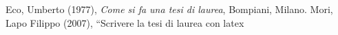 \begin{thebibliography}{9}
Eco, Umberto (1977),
\emph{Come si fa una tesi di
laurea}, Bompiani, Milano.
Mori, Lapo Filippo (2007),
“Scrivere la tesi di laurea
con latex
\end{thebibliography}